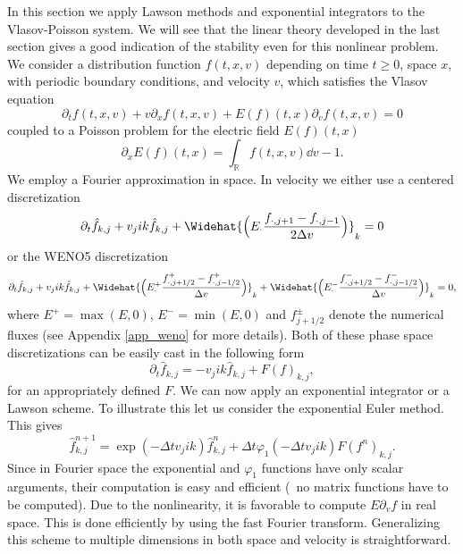 In this section we apply Lawson methods and exponential integrators to the Vlasov-Poisson system. We will see that the linear theory developed in the last section gives a good indication of the stability even for this nonlinear problem. We consider a distribution function $f(t, x, v)$ depending on time $t\geq 0$, space $x$, with periodic boundary conditions, and velocity $v$, which satisfies the Vlasov equation 
\begin{equation}
	\label{vlasov}
  \partial_t f(t, x, v) + v\partial_x f(t, x, v) + E(f)(t, x)\partial_v f(t, x, v) = 0   
\end{equation}
coupled to a Poisson problem for the electric field $E(f)(t, x)$ 
\begin{equation}
  \partial_x  E(f)(t, x)= \int_{\mathbb{R}} f(t, x, v) \dd{v} -1. 
\end{equation}
We employ a Fourier approximation in space. In velocity we either use a centered discretization
$$
  \partial_t \hat{f}_{k,j} + v_j i k \hat{f}_{k,j} + \Widehat{\Big(E_{\cdot} \frac{f_{\cdot,j+1}  -f_{\cdot,j-1}}{2\Delta v}\Big)}_k = 0
$$  
or the WENO5 discretization
\begin{equation}
  \displaystyle\partial_t \hat{f}_{k,j} + v_j ik \hat{f}_{k,j} + \Widehat{\Big(E^+_{\cdot} \frac{f^+_{\cdot,j+1/2} - f^+_{\cdot,j-1/2}}{\Delta v} \Big)}_k 
+ \Widehat{\Big(E^-_{\cdot} \frac{f^-_{\cdot,j+1/2} - f^-_{\cdot,j-1/2}}{\Delta v} \Big)}_k = 0, 
  \label{vp_weno}
\end{equation} 
where $E^+=\max(E, 0)$, $E^-=\min(E, 0)$ and $f^\pm_{j+1/2}$ denote the numerical fluxes (see Appendix \ref{app_weno} for more details). Both of these phase space discretizations can be easily cast in the following form
\[
  \partial_t \hat{f}_{k,j} = - v_j i k \hat{f}_{k,j} + F(f)_{k,j},
\]
for an appropriately defined $F$. We can now apply an exponential integrator or a Lawson scheme. To illustrate this let us consider the exponential Euler method. This gives
\[
  \hat{f}^{n+1}_{k,j} = \exp(-\Delta t v_j i k) \hat{f}^n_{k,j} + \Delta t \varphi_1(-\Delta t v_j i k) F(f^n)_{k,j}.
\]
Since in Fourier space the exponential and $\varphi_1$ functions have only scalar arguments, their computation is easy and efficient (\ie~no matrix functions have to be computed). Due to the nonlinearity, it is favorable to compute $E \partial_v f$ in real space. This is done efficiently by using the fast Fourier transform. Generalizing this scheme to multiple dimensions in both space and velocity is straightforward.

